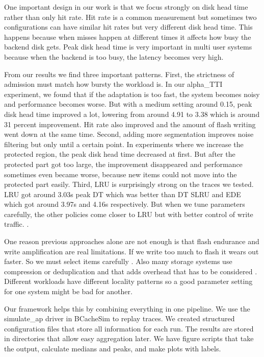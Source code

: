 \documentclass[sigconf]{acmart}
\begin{document}
One important design in our work is that we focus strongly on disk head time rather than only hit rate. Hit rate is a common measurement but sometimes two configurations can have similar hit rates but very different disk head time. This happens because when misses happen at different times it affects how busy the backend disk gets. Peak disk head time is very important in multi user systems because when the backend is too busy, the latency becomes very high.

From our results we find three important patterns. First, the strictness of admission must match how bursty the workload is. In our alpha\_TTI experiment, we found that if the adaptation is too fast, the system becomes noisy and performance becomes worse. But with a medium setting around 0.15, peak disk head time improved a lot, lowering from around 4.91 to 3.38 which is around 31 percent improvement. Hit rate also improved and the amount of flash writing went down at the same time. Second, adding more segmentation improves noise filtering but only until a certain point. In experiments where we increase the protected region, the peak disk head time decreased at first. But after the protected part got too large, the improvement disappeared and performance sometimes even became worse, because new items could not move into the protected part easily. Third, LRU is surprisingly strong on the traces we tested. LRU got around 3.03s peak DT which was better than DT SLRU and EDE which got around 3.97s and 4.16s respectively. But when we tune parameters carefully, the other policies come closer to LRU but with better control of write traffic. \cite{Yang2022CacheSack}.

One reason previous approaches alone are not enough is that flash endurance and write amplification are real limitations. If we write too much to flash it wears out faster. So we must select items carefully \cite{Yang2022CacheSack}. Also many storage systems use compression or deduplication and that adds overhead that has to be considered \cite{Wang2020AustereCache}. Different workloads have different locality patterns so a good parameter setting for one system might be bad for another. 

Our framework helps this by combining everything in one pipeline. We use the simulate\_ap driver in BCacheSim to replay traces. We created structured configuration files that store all information for each run. The results are stored in directories that allow easy aggregation later. We have figure scripts that take the output, calculate medians and peaks, and make plots with labels. 
\end{document}
